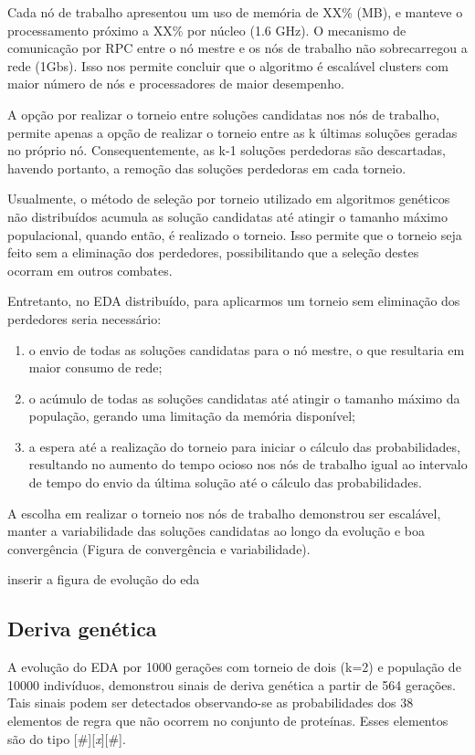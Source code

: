 Cada nó de trabalho apresentou um uso de memória de XX\% (MB), e manteve o processamento próximo a XX\% por núcleo (1.6 GHz). O mecanismo de comunicação por RPC entre o nó mestre e os nós de trabalho não sobrecarregou a rede (1Gbs). Isso nos permite concluir que o algoritmo é escalável clusters com maior número de nós e processadores de maior desempenho.

A opção por realizar o torneio entre soluções candidatas nos nós de trabalho, permite apenas a opção de realizar o torneio entre as k últimas soluções geradas no próprio nó. Consequentemente, as k-1 soluções perdedoras são descartadas, havendo portanto, a remoção das soluções perdedoras em cada torneio. 

Usualmente, o método de seleção por torneio utilizado em algoritmos genéticos não distribuídos acumula as solução candidatas até atingir o tamanho máximo populacional, quando então, é realizado o torneio. Isso permite que o torneio seja feito sem a eliminação dos perdedores, possibilitando que a seleção destes ocorram em outros combates.

Entretanto, no EDA distribuído, para aplicarmos um torneio sem eliminação dos perdedores seria necessário:

\begin{enumerate}
	\item o envio de todas as soluções candidatas para o nó mestre, o que resultaria em maior consumo de rede;
	\item o acúmulo de todas as soluções candidatas até atingir o tamanho máximo da população, gerando uma limitação da memória disponível;
	\item a espera até a realização do torneio para iniciar o cálculo das probabilidades, resultando no aumento do tempo ocioso nos nós de trabalho igual ao intervalo de tempo do envio da última solução até o cálculo das probabilidades.
\end{enumerate} 

A escolha em realizar o torneio nos nós de trabalho demonstrou ser escalável, manter a variabilidade das soluções candidatas ao longo da evolução e boa convergência (Figura de convergência e variabilidade).

inserir a figura de evolução do eda

\subsection{Deriva genética}

A evolução do EDA por 1000 gerações com torneio de dois (k=2) e população de 10000 indivíduos, demonstrou sinais de deriva genética a partir de 564 gerações. Tais sinais podem ser detectados observando-se as probabilidades dos 38 elementos de regra que não ocorrem no conjunto de proteínas. Esses elementos são do tipo [\#][\textit{x}][\#].

